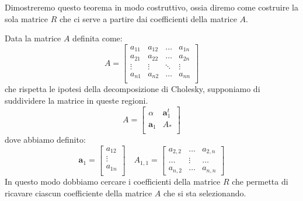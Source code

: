\begin{dimostrazione}
    Dimostreremo questo teorema in modo costruttivo, ossia diremo come costruire
    la sola matrice $R$ che ci serve a partire dai coefficienti della matrice $A$.

    Data la matrice $A$ definita come:
    \begin{equation*}
        A=\left[\begin{array}{cccc}
                a_{11} & a_{12} & \dots  & a_{1n} \\
                a_{21} & a_{22} & \dots  & a_{2n} \\
                \vdots & \vdots & \ddots & \vdots \\
                a_{n1} & a_{n2} & \dots  & a_{nn} \\
            \end{array}\right]
    \end{equation*}
    che rispetta le ipotesi della decomposizione di Cholesky, supponiamo di
    suddividere la matrice in queste regioni.
    \begin{equation*}
        A=\left[\begin{array}{c|c}
                \alpha       & \textbf{a}_1^t \\
                \textbf{a}_1 & A_\ast         \\
            \end{array}\right]
    \end{equation*}
    dove abbiamo definito:
    \begin{equation*}
        \textbf{a}_1 = \left[\begin{array}{c}
                a_{12} \\
                \vdots \\
                a_{1n} \\
            \end{array}\right] \quad A_{1, 1} = \left[
            \begin{array}{ccc}
                a_{2, 2} & \dots  & a_{2, n} \\
                \dots    & \vdots & \dots    \\
                a_{n, 2} & \dots  & a_{n, n}
            \end{array} \right]
    \end{equation*}
    In questo modo dobbiamo cercare i coefficienti della matrice $R$ che permetta
    di ricavare ciascun coefficiente della matrice $A$ che si sta selezionando.


\end{dimostrazione}

